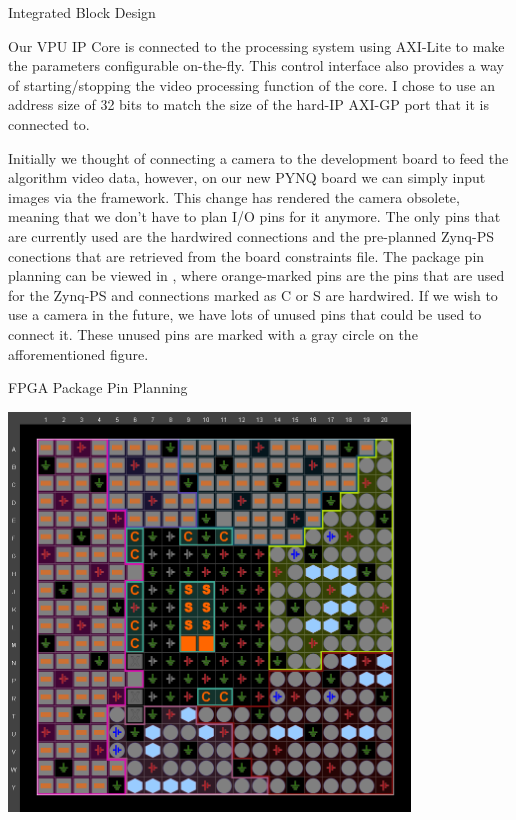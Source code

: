 \documentclass{matthijs}
\begin{document}
\begin{hoofdstuk}{Integrated Block Design}
		\bigskip

		Our VPU IP Core is connected to the processing system using AXI-Lite to make the parameters configurable on-the-fly.
		This control interface also provides a way of starting/stopping the video processing function of the core.
		I chose to use an address size of 32 bits to match the size of the hard-IP AXI-GP port that it is connected to.

		\bigskip

		Initially we thought of connecting a camera to the development board to feed the algorithm video data, however, on our new PYNQ board we can simply input images via the framework.
		This change has rendered the camera obsolete, meaning that we don't have to plan I/O pins for it anymore.
		The only pins that are currently used are the hardwired connections and the pre-planned Zynq-PS conections that are retrieved from the board constraints file.
		The package pin planning can be viewed in , where orange-marked pins are the pins that are used for the Zynq-PS and connections marked as C or S are hardwired.
		If we wish to use a camera in the future, we have lots of unused pins that could be used to connect it.
		These unused pins are marked with a gray circle on the afforementioned figure.

		\begin{figuur}{FPGA Package Pin Planning}

			\includegraphics[width=0.8\textwidth]{vivado-synth-package.png}

		\end{figuur}


\end{hoofdstuk}
\end{document}

